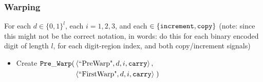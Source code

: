     \subsubsection{ Warping }

        For each $d \in \{0, 1\}^l$, each $i = 1, 2, 3$, and each {\inc} $\in \{ {\tt increment, copy } \}$
        (note: since this might not be the correct notation, in words: do this for each binary encoded digit of length $l$,
        for each digit-region index, and both copy/increment signals)

        \begin{itemize}

            \item Create
            $\begin{aligned}[t]
                {\tt Pre\_Warp}(& \left\langle \text{``PreWarp"}, d, i, {\tt carry} \right\rangle, \\
                         & \left\langle \text{``FirstWarp"}, d, i, {\tt carry} \right\rangle \;)
            \end{aligned}$
            \vspace{.5cm}



\end{itemize}

